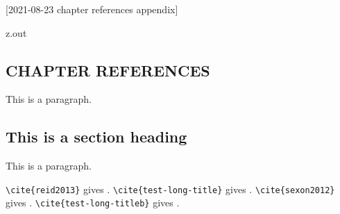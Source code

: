 [2021-08-23 chapter references appendix]

\begin{VerbatimOut}{z.out}
\begin{refsection}
\chapter{CHAPTER REFERENCES}

This is a paragraph.

\section{This is a section heading}

This is a paragraph.

\verb+\cite{reid2013}+ gives \cite{reid2013}.
\verb+\cite{test-long-title}+ gives \cite{test-long-title}.
\verb+\cite{sexon2012}+ gives \cite{sexon2012}.
\verb+\cite{test-long-titleb}+ gives \cite{test-long-titleb}.

\PrintChapterBibliography
\end{refsection}
\end{VerbatimOut}

\MyIO
